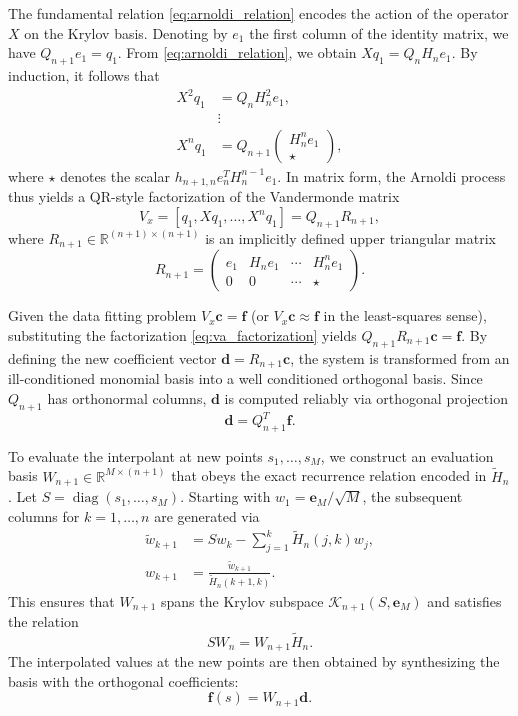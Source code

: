 \documentclass[11pt]{article}
\begin{document}
The fundamental relation \eqref{eq:arnoldi_relation} encodes the action of the operator $X$ on the Krylov basis. Denoting by $e_1$ the first column of the identity matrix, we have $Q_{n+1} e_1 = q_1$. From \eqref{eq:arnoldi_relation}, we obtain $X q_1 = Q_n H_n e_1$. By induction, it follows that
\begin{align*}
X^2 q_1 &= Q_n H_n^2 e_1, \\
&\vdots \\
X^n q_1 &= Q_{n+1} \begin{pmatrix} H_n^n e_1 \\ \star \end{pmatrix},
\end{align*}
where $\star$ denotes the scalar $h_{n+1,n} e_n^T H_n^{n-1} e_1$. In matrix form, the Arnoldi process thus yields a QR-style factorization of the Vandermonde matrix
\begin{equation}
V_x = [q_1, X q_1, \ldots, X^n q_1] = Q_{n+1} R_{n+1}, \label{eq:va_factorization}
\end{equation}
where $R_{n+1} \in \mathbb{R}^{(n+1) \times (n+1)}$ is an implicitly defined upper triangular matrix
 $$
R_{n+1} = \begin{pmatrix} e_1 & H_n e_1 & \cdots & H_n^n e_1 \\ 0 & 0 & \cdots & \star \end{pmatrix}.  $$
 

Given the data fitting problem $V_x \mathbf{c} = \mathbf{f}$ (or $V_x \mathbf{c} \approx \mathbf{f}$ in the least-squares sense), substituting the factorization \eqref{eq:va_factorization} yields $Q_{n+1} R_{n+1} \mathbf{c} = \mathbf{f}$. By defining the new coefficient vector $\mathbf{d} = R_{n+1} \mathbf{c}$, the system is transformed from an ill-conditioned monomial basis into a well conditioned orthogonal basis. Since $Q_{n+1}$ has orthonormal columns, $\mathbf{d}$ is computed reliably via orthogonal projection
 $$
\mathbf{d} = Q_{n+1}^T \mathbf{f}.  $$

To evaluate the interpolant at new points $s_1, \ldots, s_M$, we construct an evaluation basis $W_{n+1} \in \mathbb{R}^{M \times (n+1)}$ that obeys the exact recurrence relation encoded in $\tilde{H}_n$. Let $S = \operatorname{diag}(s_1,\ldots,s_M)$. Starting with $w_1 = \mathbf{e}_M / \sqrt{M}$, the subsequent columns for $k = 1, \ldots, n$ are generated via
\begin{align}
\tilde{w}_{k+1} &= S w_k - \sum_{j=1}^k \tilde{H}_n(j,k) w_j, \\
w_{k+1} &= \frac{\tilde{w}_{k+1}}{\tilde{H}_n(k+1,k)}. \label{eq:eval_recurrence}
\end{align}
This ensures that $W_{n+1}$ spans the Krylov subspace $\mathcal{K}_{n+1}(S, \mathbf{e}_M)$ and satisfies the relation
 $$
S W_n = W_{n+1} \tilde{H}_n.  $$
The interpolated values at the new points are then obtained by synthesizing the basis with the orthogonal coefficients:
 $$
\mathbf{f}(s) = W_{n+1} \mathbf{d}.  $$
\end{document}
